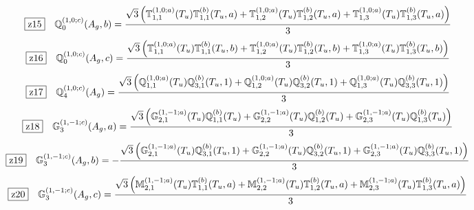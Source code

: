 \documentclass[fleqn,10pt,landscape]{jsarticle}
\begin{document}
\begin{dmath*}
\hspace*{3mm}\fbox{z15}\quad \mathbb{Q}_{0}^{(1,0;c)}(A_{g},b)=\frac{\sqrt{3} \left(\mathbb{T}_{1,1}^{(1,0;a)}(T_{u}) \mathbb{T}_{1,1}^{(b)}(T_{u},a) + \mathbb{T}_{1,2}^{(1,0;a)}(T_{u}) \mathbb{T}_{1,2}^{(b)}(T_{u},a) + \mathbb{T}_{1,3}^{(1,0;a)}(T_{u}) \mathbb{T}_{1,3}^{(b)}(T_{u},a)\right)}{3}
\end{dmath*}
\begin{dmath*}
\hspace*{3mm}\fbox{z16}\quad \mathbb{Q}_{0}^{(1,0;c)}(A_{g},c)=\frac{\sqrt{3} \left(\mathbb{T}_{1,1}^{(1,0;a)}(T_{u}) \mathbb{T}_{1,1}^{(b)}(T_{u},b) + \mathbb{T}_{1,2}^{(1,0;a)}(T_{u}) \mathbb{T}_{1,2}^{(b)}(T_{u},b) + \mathbb{T}_{1,3}^{(1,0;a)}(T_{u}) \mathbb{T}_{1,3}^{(b)}(T_{u},b)\right)}{3}
\end{dmath*}
\begin{dmath*}
\hspace*{3mm}\fbox{z17}\quad \mathbb{Q}_{4}^{(1,0;c)}(A_{g})=\frac{\sqrt{3} \left(\mathbb{Q}_{1,1}^{(1,0;a)}(T_{u}) \mathbb{Q}_{3,1}^{(b)}(T_{u},1) + \mathbb{Q}_{1,2}^{(1,0;a)}(T_{u}) \mathbb{Q}_{3,2}^{(b)}(T_{u},1) + \mathbb{Q}_{1,3}^{(1,0;a)}(T_{u}) \mathbb{Q}_{3,3}^{(b)}(T_{u},1)\right)}{3}
\end{dmath*}
\begin{dmath*}
\hspace*{3mm}\fbox{z18}\quad \mathbb{G}_{3}^{(1,-1;c)}(A_{g},a)=\frac{\sqrt{3} \left(\mathbb{G}_{2,1}^{(1,-1;a)}(T_{u}) \mathbb{Q}_{1,1}^{(b)}(T_{u}) + \mathbb{G}_{2,2}^{(1,-1;a)}(T_{u}) \mathbb{Q}_{1,2}^{(b)}(T_{u}) + \mathbb{G}_{2,3}^{(1,-1;a)}(T_{u}) \mathbb{Q}_{1,3}^{(b)}(T_{u})\right)}{3}
\end{dmath*}
\begin{dmath*}
\hspace*{3mm}\fbox{z19}\quad \mathbb{G}_{3}^{(1,-1;c)}(A_{g},b)=- \frac{\sqrt{3} \left(\mathbb{G}_{2,1}^{(1,-1;a)}(T_{u}) \mathbb{Q}_{3,1}^{(b)}(T_{u},1) + \mathbb{G}_{2,2}^{(1,-1;a)}(T_{u}) \mathbb{Q}_{3,2}^{(b)}(T_{u},1) + \mathbb{G}_{2,3}^{(1,-1;a)}(T_{u}) \mathbb{Q}_{3,3}^{(b)}(T_{u},1)\right)}{3}
\end{dmath*}
\begin{dmath*}
\hspace*{3mm}\fbox{z20}\quad \mathbb{G}_{3}^{(1,-1;c)}(A_{g},c)=\frac{\sqrt{3} \left(\mathbb{M}_{2,1}^{(1,-1;a)}(T_{u}) \mathbb{T}_{1,1}^{(b)}(T_{u},a) + \mathbb{M}_{2,2}^{(1,-1;a)}(T_{u}) \mathbb{T}_{1,2}^{(b)}(T_{u},a) + \mathbb{M}_{2,3}^{(1,-1;a)}(T_{u}) \mathbb{T}_{1,3}^{(b)}(T_{u},a)\right)}{3}
\end{dmath*}
\end{document}
